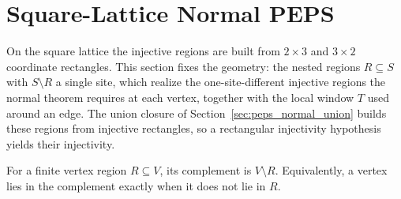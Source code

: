 \section{Square-Lattice Normal PEPS}\label{sec:peps_normal_square}

On the square lattice the injective regions are built from $2\times3$ and
$3\times2$ coordinate rectangles. This section fixes the geometry: the nested
regions $R\subseteq S$ with $S\setminus R$ a single site, which realize the
one-site-different injective regions the normal theorem requires at each vertex,
together with the local window $T$ used around an edge. The union closure of
Section~\ref{sec:peps_normal_union} builds these regions from injective
rectangles, so a rectangular injectivity hypothesis yields their injectivity.

\begin{definition}%
    \label{def:peps_regionComplement}
    \leanok
    For a finite vertex region $R\subseteq V$, its complement is
    $V\setminus R$. Equivalently, a vertex lies in the complement exactly
    when it does not lie in $R$.
\end{definition}

